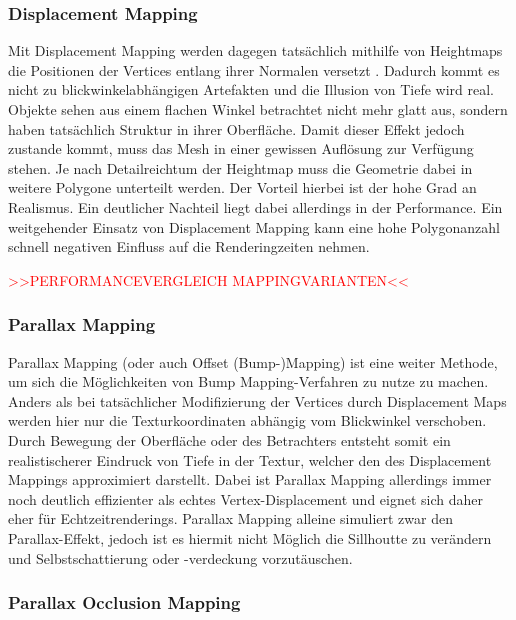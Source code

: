 \subsubsection{Displacement Mapping}
Mit Displacement Mapping werden dagegen tatsächlich mithilfe von Heightmaps die Positionen
der Vertices entlang ihrer Normalen versetzt \parencite{Cook1984,Cook1987}. Dadurch kommt es nicht zu blickwinkelabhängigen Artefakten
und die Illusion von Tiefe wird real. Objekte sehen aus einem flachen Winkel betrachtet nicht mehr
glatt aus, sondern haben tatsächlich Struktur in ihrer Oberfläche. Damit dieser Effekt jedoch zustande kommt,
muss das Mesh in einer gewissen Auflösung zur Verfügung stehen. Je nach Detailreichtum der Heightmap
muss die Geometrie dabei in weitere Polygone unterteilt werden. Der Vorteil hierbei ist der hohe
Grad an Realismus. Ein deutlicher Nachteil liegt dabei allerdings in der Performance.
Ein weitgehender Einsatz von Displacement Mapping kann eine hohe Polygonanzahl schnell
negativen Einfluss auf die Renderingzeiten nehmen.

\textcolor{red}{>>PERFORMANCEVERGLEICH MAPPINGVARIANTEN<<}

\subsubsection{Parallax Mapping}

Parallax Mapping (oder auch Offset (Bump-)Mapping) ist eine weiter Methode, um sich die Möglichkeiten von
Bump Mapping-Verfahren zu nutze zu machen. Anders als bei tatsächlicher Modifizierung der Vertices
durch Displacement Maps werden hier nur die Texturkoordinaten abhängig vom Blickwinkel verschoben. \parencite{Kaneko2001, Welsh2004}
Durch Bewegung der Oberfläche oder des Betrachters entsteht somit ein realistischerer Eindruck
von Tiefe in der Textur, welcher den des Displacement Mappings approximiert darstellt.
Dabei ist Parallax Mapping allerdings immer noch deutlich effizienter als echtes Vertex-Displacement
und eignet sich daher eher für Echtzeitrenderings.
Parallax Mapping alleine simuliert zwar den Parallax-Effekt, jedoch ist es hiermit nicht Möglich die Sillhoutte zu verändern und
Selbstschattierung oder -verdeckung vorzutäuschen.


\subsubsection{Parallax Occlusion Mapping}

